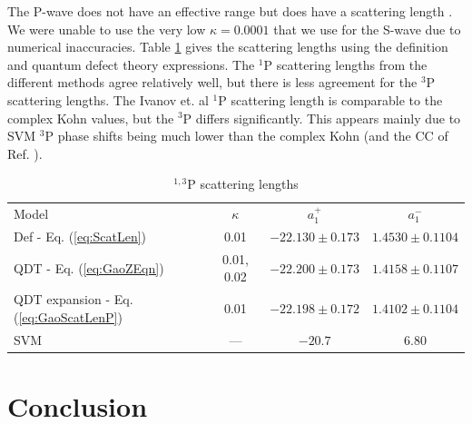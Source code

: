 \documentclass[reprint,showpacs,preprintnumbers,amsmath,amssymb,pra,aps]{revtex4-1}
\newcommand{\todoi}{\todo[inline]}
\begin{document}
The P-wave does not have an effective range but does have a scattering length \cite{Levy1963}. We were unable to use the very low $\kappa = 0.0001$ that we use for the S-wave due to numerical inaccuracies. Table \ref{tab:PWaveScatLen} gives the scattering lengths using the definition and quantum defect theory expressions. The $^1$P scattering lengths from the different methods agree relatively well, but there is less agreement for the $^3$P scattering lengths. The Ivanov et. al \cite{Ivanov2002} $^1$P scattering length is comparable to the complex Kohn values, but the $^3$P differs significantly. This appears mainly due to SVM $^3$P phase shifts being much lower than the complex Kohn (and the CC of Ref. \cite{Blackwood2002}).

\begin{table}[H]
\begin{center}
\begin{ruledtabular}
\begin{tabular}{l c c c}
Model & $\kappa$ & $a_1^+$ & $a_1^-$ \\
\colrule
Def - Eq. (\ref{eq:ScatLen}) & 0.01 & $-22.130 \pm 0.173$ & $1.4530 \pm 0.1104$ \\
QDT - Eq. (\ref{eq:GaoZEqn}) & 0.01, 0.02 & $-22.200 \pm 0.173$ & $1.4158 \pm 0.1107$ \\
QDT expansion - Eq. (\ref{eq:GaoScatLenP}) & 0.01 & $-22.198 \pm 0.172$ & $1.4102 \pm 0.1104$ \\
\colrule
SVM \cite{Ivanov2002} & --- & $-20.7$ & $6.80$ 
\end{tabular}
\end{ruledtabular}
\caption{$^{1,3}$P scattering lengths}
\label{tab:PWaveScatLen}
\end{center}
\end{table}






\section{Conclusion}
\end{document}
